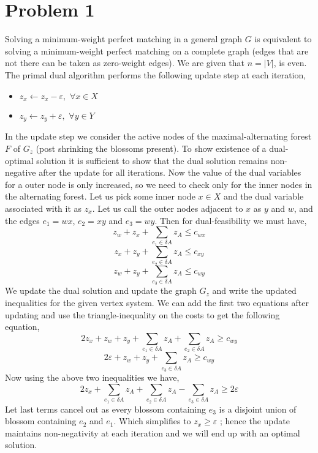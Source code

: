 \documentclass{article}
\numberwithin{equation}{section}
\newcommand{\card}[1]{\left|#1\right|}
\begin{document}
\section{Problem 1}
Solving a minimum-weight perfect matching in a general graph $G$ is equivalent to solving a minimum-weight perfect matching on a complete graph (edges that are not there can be taken as zero-weight edges). We are given that $n = \card{V}$, is even. The primal dual algorithm performs the following update step at each iteration, 
\begin{itemize}
    \item $z_x \leftarrow z_x - \varepsilon, \, \, \forall x \in X$ 
    \item $z_y \leftarrow z_y + \varepsilon, \, \, \forall y \in Y$ 
\end{itemize}
In the update step we consider the active nodes of the maximal-alternating forest $F$ of $G_z$ (post shrinking the blossoms present). To show existence of a dual-optimal solution it is sufficient to show that the dual solution remains non-negative after the update for all iterations. Now the value of the dual variables for a outer node is only increased, so we need to check only for the inner nodes in the alternating forest. Let us pick some inner node $x\in X$ and the dual variable associated with it as $z_x$. Let us call the outer nodes adjacent to $x$ as $y$ and $w$, and the edges $e_1 =wx$, $e_2 = xy$ and $e_3 = wy$. Then for dual-feasibility we must have, 
\begin{equation}
    z_w+z_x + \sum_{e_1\in \delta{A}} z_A\le c_{wx}
\end{equation}
\begin{equation}
    z_x+z_y + \sum_{e_2\in \delta{A}} z_A\le c_{xy}
\end{equation}
\begin{equation}
    z_w+z_y + \sum_{e_3\in \delta{A}} z_A\le c_{wy}
\end{equation}
We update the dual solution and update the graph $G_z$ and write the updated inequalities for the given vertex system. We can add the first two equations after updating and use the triangle-inequality on the costs to get the following equation, 
\begin{equation}
    2z_x + z_w + z_y +  \sum_{e_1\in \delta{A}} z_A +  \sum_{e_2\in \delta{A}} z_A \ge c_{wy}
\end{equation}
\begin{equation}
    2\varepsilon + z_w + z_y +  \sum_{e_3\in \delta{A}} z_A  \ge c_{wy}
\end{equation}
Now using the above two inequalities we have, 
\begin{equation}
    2z_x + \sum_{e_1\in \delta{A}} z_A + \sum_{e_2\in \delta{A}} z_A -  \sum_{e_3\in \delta{A}} z_A \ge 2\varepsilon
\end{equation}
Let last terms cancel out as every blossom containing $e_3$ is a disjoint union of blossom containing $e_2$ and $e_1$. Which simplifies to $z_x \ge \varepsilon$ ; hence the update maintains non-negativity at each iteration and we will end up with an optimal solution. 
\newpage
\end{document}
